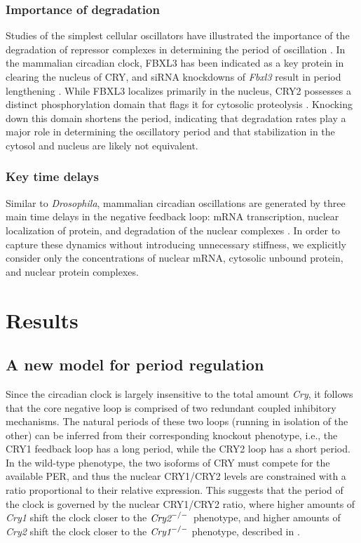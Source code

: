 \subsubsection{Importance of degradation}
Studies of the simplest cellular oscillators have illustrated the importance of the degradation of repressor complexes in determining the period of oscillation \cite{Cookson2009}.
In the mammalian circadian clock, FBXL3 has been indicated as a key protein in clearing the nucleus of CRY, and siRNA knockdowns of {\it Fbxl3} result in period lengthening \cite{Zhang2009}.
While FBXL3 localizes primarily in the nucleus, CRY2 possesses a distinct phosphorylation domain that flags it for cytosolic proteolysis \cite{Kurabayashi2010}.
Knocking down this domain shortens the period, indicating that degradation rates play a major role in determining the oscillatory period and that stabilization in the cytosol and nucleus are likely not equivalent.

\subsubsection{Key time delays}
Similar to {\it Drosophila}, mammalian circadian oscillations are generated by three main time delays in the negative feedback loop: mRNA transcription, nuclear localization of protein, and degradation of the nuclear complexes \cite{Vielhaber2000a}.
In order to capture these dynamics without introducing unnecessary stiffness, we explicitly consider only the concentrations of nuclear mRNA, cytosolic unbound protein, and nuclear protein complexes.

\section{Results}

\subsection{A new model for period regulation}
Since the circadian clock is largely insensitive to the total amount {\it Cry}, it follows that the core negative loop is comprised of two redundant coupled inhibitory mechanisms. 
The natural periods of these two loops (running in isolation of the other) can be inferred from their corresponding knockout phenotype, i.e., the CRY1 feedback loop has a long period, while the CRY2 loop has a short period. 
In the wild-type phenotype, the two isoforms of CRY must compete for the available PER, and thus the nuclear CRY1/CRY2 levels are constrained with a ratio proportional to their relative expression. 
This suggests that the period of the clock is governed by the nuclear CRY1/CRY2 ratio, where higher amounts of {\it Cry1} shift the clock closer to the $\text{\it Cry2}^{-/-}$ phenotype, and higher amounts of {\it Cry2} shift the clock closer to the $\text{\it Cry1}^{-/-}$ phenotype, described in .

